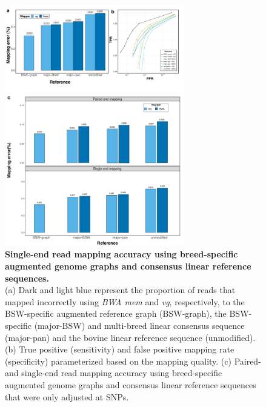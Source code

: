 \documentclass[../main.tex]{subfiles}
\begin{document}
\begin{flushleft}
\begin{figure}[!htb]
    \centering
    \includegraphics[width=0.7\textwidth]{paper2/supplement/sp313.pdf}
    \caption[Single-end read mapping to consensus genome]{\textbf{Single-end read mapping accuracy using breed-specific
    augmented genome graphs and consensus linear reference sequences.} \\
    \small{(a) Dark and light blue represent the proportion of reads that mapped incorrectly
    using \emph{BWA mem} and \emph{vg}, respectively, to the BSW-specific augmented reference
    graph (BSW-graph), the BSW-specific (major-BSW) and multi-breed linear
    consensus sequence (major-pan) and the bovine linear reference sequence
    (unmodified). (b) True positive (sensitivity) and false positive mapping rate
    (specificity) parameterized based on the mapping quality. (c) Paired- and single-end
    read mapping accuracy using breed-specific augmented genome graphs and
    consensus linear reference sequences that were only adjusted at SNPs.}}
    \label{sup_fig:s313}
\end{figure}


\end{flushleft}
\end{document}
